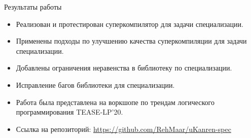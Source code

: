 \documentclass[xcolor=table]{beamer}
\begin{document}
%
\begin{frame}{Результаты работы}
  \begin{itemize}
  \item Реализован и протестирован суперкомпилятор для задачи специализации.
  \item Применены подходы по улучшению качества суперкомпиляции для задачи специализации.
  \item Добавлены ограничения неравенства в библиотеку по специализации.
  \item Исправление багов библиотеки для специализации.
\item Работа была представлена на воркшопе по трендам логического программирования TEASE-LP'20.
\item Ссылка на репозиторий: \url{https://github.com/RehMaar/uKanren-spec}
  \end{itemize}
\end{frame}



\appendix
\end{document}
